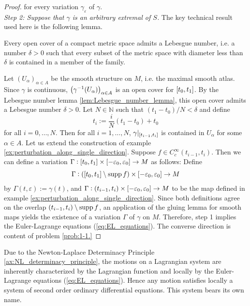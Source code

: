 \begin{proof}
	\noindent for every variation $\gamma_\varepsilon$ of $\gamma$.\\
	\emph{Step 2: Suppose that $\gamma$ is an arbitrary extremal of $S$.} The key technical result used here is the following lemma.
	\begin{lemma}
		\label{lem:Lebesgue_number_lemma}
		Every open cover of a compact metric space admits a Lebesgue number, i.e. a number $\delta > 0$ such that every subset of the metric space with diameter less than $\delta$ is contained in a member of the family.
	\end{lemma}
	Let $(U_\alpha)_{\alpha \in A}$ be the smooth structure on $M$, i.e. the maximal smooth atlas. Since $\gamma$ is continuous, $\del[1]{\gamma^{-1}(U_\alpha)}_{\alpha \in A}$ is an open cover for $\intcc[0]{t_0,t_1}$. By the Lebesgue number lemma \ref{lem:Lebesgue_number_lemma}, this open cover admits a Lebesgue number $\delta > 0$. Let $N \in \mathbb{N}$ such that $(t_1 - t_0)/N < \delta$ and define
	\begin{equation*}
		t_i := \frac{i}{N}(t_1 - t_0) + t_0
	\end{equation*}
	\noindent for all $i = 0,\dots,N$. Then for all $i = 1,\dots,N$, $\gamma\vert_{\intcc[0]{t_{i - 1},t_i}}$ is contained in $U_\alpha$ for some $\alpha \in A$. Let us extend the construction of example \ref{ex:perturbation_along_single_direction}. Suppose $f \in C^\infty_c(t_{i - 1},t_i)$. Then we can define a variation $\Gamma : \intcc[0]{t_0,t_1} \times \intcc[0]{-\varepsilon_0,\varepsilon_0} \to M$ as follows: Define 
	\begin{equation*}
		\Gamma : \del[0]{\intcc[0]{t_0,t_1}\setminus \supp f} \times \intcc[0]{-\varepsilon_0,\varepsilon_0} \to M
	\end{equation*}
	\noindent by $\Gamma(t,\varepsilon) := \gamma(t)$, and $\Gamma : \intoo[0]{t_{i - 1},t_i} \times \intcc[0]{-\varepsilon_0,\varepsilon_0} \to M$ to be the map defined in example \ref{ex:perturbation_along_single_direction}. Since both definitions agree on the overlap $\intoo[0]{t_{i - 1},t_i} \setminus \supp f$, an application of the gluing lemma for smooth maps \cite[35]{lee:smooth_manifolds:2013} yields the existence of a variation $\Gamma$ of $\gamma$ on $M$.
	Therefore, step 1 implies the Euler-Lagrange equations (\ref{eq:EL_equations}). The converse direction is content of problem \ref{prob:1-1.}
\end{proof}

Due to the Newton-Laplace Determinacy Principle \ref{ax:NL_determinacy_principle}, the motions on a Lagrangian system are inherently characterized by the Lagrangian function and locally by the Euler-Lagrange equations (\ref{eq:EL_equations}). Hence any motion satisfies locally a system of second order ordinary differential equations. This system bears its own name.

